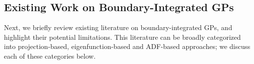 \documentclass[aos,preprint]{imsart}
\theoremstyle{plain}
\newcommand{\CalF}{\mathcal{F}}
\newcommand{\Bomega}{\boldsymbol{\omega}}
\newcommand{\cmtS}[1]{{\color{red}{(Simon: #1)}}}
\newcommand{\cmtL}[1]{{\color{orange}{(Leon: #1)}}}
\theoremstyle{remark}
\begin{document}




\subsection{Existing Work on Boundary-Integrated GPs}

Next, we briefly review existing literature on boundary-integrated GPs, and highlight their potential limitations. This literature can be broadly categorized into projection-based, eigenfunction-based and ADF-based approaches; we discuss each of these categories below.

\end{document}
